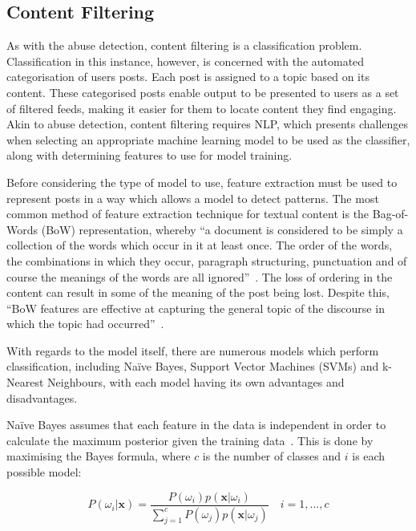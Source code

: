 \subsection{Content Filtering} \label{sec:research-content-filtering}
As with the abuse detection, content filtering is a classification problem. Classification in this instance, however, is concerned with the automated categorisation of users posts. Each post is assigned to a topic based on its content. These categorised posts enable output to be presented to users as a set of filtered feeds, making it easier for them to locate content they find engaging. Akin to abuse detection, content filtering requires NLP, which presents challenges when selecting an appropriate machine learning model to be used as the classifier, along with determining features to use for model training.

Before considering the type of model to use, feature extraction must be used to represent posts in a way which allows a model to detect patterns. The most common method of feature extraction technique for textual content is the Bag-of-Words (BoW) representation, whereby ``a document is considered to be simply a collection of the words which occur in it at least once. The order of the words, the combinations in which they occur, paragraph structuring, punctuation and of course the meanings of the words are all ignored''~\cite{Bramer:BoW}. The loss of ordering in the content can result in some of the meaning of the post being lost. Despite this, ``BoW features are effective at capturing the general topic of the discourse in which the topic had occurred''~\cite{Jurafsky:BoW}.

With regards to the model itself, there are numerous models which perform classification, including Na\"ive Bayes, Support Vector Machines (SVMs) and k-Nearest Neighbours, with each model having its own advantages and disadvantages.

Na\"ive Bayes assumes that each feature in the data is independent in order to calculate the maximum posterior given the training data~\cite{Kuncheva:Bayes}. This is done by maximising the Bayes formula, where $c$ is the number of classes and $i$ is each possible model:

\begin{equation}
\label{eq:bayes}
P(\omega_{i}|\mathbf{x}) = \frac{P(\omega_{i})p(\mathbf{x}|\omega_{i})}{\sum_{j=1}^{c}P(\omega_{j})p(\mathbf{x}|\omega_{j})}\quad i=1,...,c
\end{equation}

